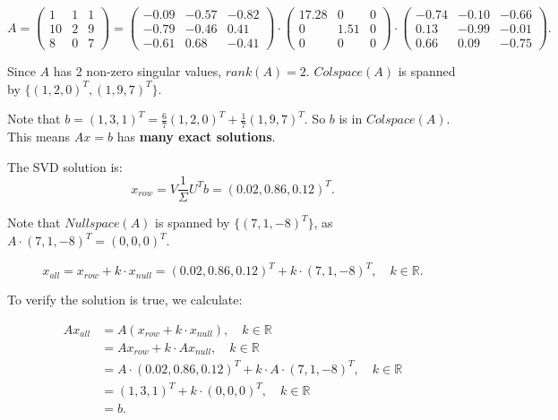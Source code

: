 \documentclass[
  course = {{16-811 Math Fundamentals for Robotics}},
  quartile = {{1}},
  assignment = 1,
  name = {{Kangle Deng}},
  email = {{kangled@andrew.cmu.edu}},
  firstexercise = 1
]{aga-homework}
\begin{document}
\begin{equation*}
    A = 
    \left(
    \begin{array}{ccc}
        1 & 1 & 1 \\
        10 & 2 & 9 \\
        8 & 0 & 7
    \end{array}
    \right) =
    \left(
    \begin{array}{ccc}
        -0.09 & -0.57 & -0.82 \\
        -0.79 & -0.46 & 0.41 \\
        -0.61 & 0.68 & -0.41
    \end{array}
    \right) \cdot
    \left(
    \begin{array}{ccc}
        17.28 & 0 & 0 \\
        0 & 1.51 & 0 \\
        0 & 0 & 0
    \end{array}
    \right) \cdot
    \left(
    \begin{array}{ccc}
        -0.74 & -0.10 & -0.66 \\
        0.13 & -0.99 & -0.01 \\
        0.66 & 0.09 & -0.75
    \end{array}
    \right).
\end{equation*}

Since $A$ has 2 non-zero singular values, $rank(A) = 2$. $Colspace(A)$ is spanned by $\{(1, 2, 0)^T, (1, 9, 7)^T\}$.

Note that $b = (1, 3, 1)^T = \frac{6}{7}(1, 2, 0)^T + \frac{1}{7}(1, 9, 7)^T$. So $b$ is in $Colspace(A)$. This means $Ax = b$ has \textbf{many exact solutions}.

The SVD solution is:
\begin{equation*}
    x_{row} = V \frac{1}{\Sigma} U^T b = (0.02, 0.86, 0.12)^T.
\end{equation*}

Note that $Nullspace(A)$ is spanned by $\{(7, 1, -8)^T\}$, as $A \cdot (7, 1, -8)^T = (0, 0, 0)^T$.

\begin{equation*}
    x_{all} = x_{row} + k\cdot x_{null} = (0.02, 0.86, 0.12)^T + k \cdot (7, 1, -8)^T, \quad k \in \mathbb{R}.
\end{equation*}

To verify the solution is true, we calculate:

\begin{equation*}
\begin{aligned}
    Ax_{all} & = A(x_{row} + k\cdot x_{null}), \quad k \in \mathbb{R} \\
    & = Ax_{row} + k\cdot Ax_{null}, \quad k \in \mathbb{R} \\
    & = A \cdot (0.02, 0.86, 0.12)^T + k\cdot A \cdot (7, 1, -8)^T, \quad k \in \mathbb{R} \\
    & = (1, 3, 1)^T + k \cdot (0, 0, 0)^T, \quad k \in \mathbb{R} \\
    & = b.
\end{aligned}
\end{equation*}
\end{document}
